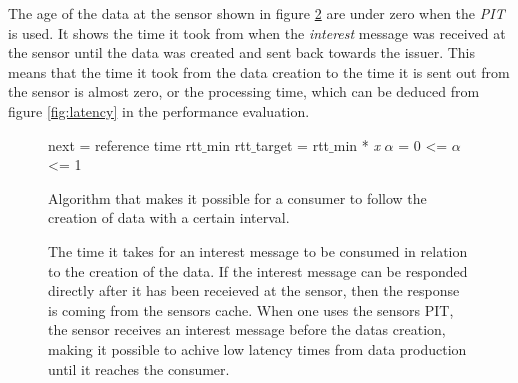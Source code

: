 The age of the data at the sensor shown in figure \ref{fig:algortihm/sensor} are under zero when the \textit{PIT} is used. It shows the time it took from when the \textit{interest} message was received at the sensor until the data was created and sent back towards the issuer. This means that the time it took from the data creation to the time it is sent out from the sensor is almost zero, or the processing time, which can be deduced from figure \ref{fig:latency} in the performance evaluation.



\begin{figure}
\begin{algorithm}[H]
 next = reference time\;
 rtt$\_$min\;
 rtt$\_$target = rtt$\_$min * \textit{x}\;
 $\alpha$ = 0 <= $\alpha$ <= 1\;

\end{algorithm}
\caption{Algorithm that makes it possible for a consumer to follow the creation of data with a certain interval.}
    \label{fig:onetime}
\end{figure}



\begin{figure}\centering{}
\caption{
The time it takes for an interest message to be consumed in relation to the creation of the data.
If the interest message can be responded directly after it has been receieved at the sensor, then the response is coming from the sensors cache. When one uses the sensors PIT, the sensor receives an interest message before the datas creation, making it possible to achive low latency times from data production until it reaches the consumer.
}
\label{fig:algortihm/sensor}
\end{figure}



